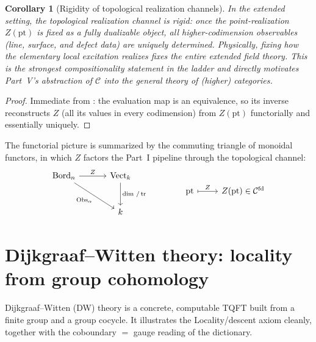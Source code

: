 \documentclass[12pt]{article}
\newtheorem{corollary}[corollary]{Corollary}
\theoremstyle{definition}
\theoremstyle{remark}
\newcommand{\Bord}{\mathrm{Bord}}
\newcommand{\Vect}{\mathrm{Vect}}
\newcommand{\Obs}{\mathrm{Obs}}
\newcommand{\sfd}{^{\mathrm{fd}}}
\begin{document}
\begin{corollary}[Rigidity of topological realization channels]
\label{cor:rigidity}
In the extended setting, the topological realization channel is \emph{rigid}: once
the point-realization $Z(\mathrm{pt})$ is fixed as a fully dualizable object, all
higher-codimension observables (line, surface, and defect data) are uniquely
determined. Physically, fixing how the elementary local excitation realizes fixes
the entire extended field theory. This is the strongest compositionality statement
in the ladder and directly motivates Part~V's abstraction of $\mathcal{C}$ into the
general theory of (higher) categories.
\end{corollary}

\begin{proof}
Immediate from : the evaluation map is an equivalence, so
its inverse reconstructs $Z$ (all its values in every codimension) from
$Z(\mathrm{pt})$ functorially and essentially uniquely.
\end{proof}

The functorial picture is summarized by the commuting triangle of monoidal
functors, in which $Z$ factors the Part~I pipeline through the topological
channel:
\[
\begin{tikzcd}[column sep=3.2em, row sep=large]
\Bord_n \arrow[r, "Z"] \arrow[dr, "\Obs_\alpha"'] & \Vect_k \arrow[d, "\dim\,/\,\mathrm{tr}"]\\
& k
\end{tikzcd}
\qquad\qquad
\begin{tikzcd}[column sep=2.4em]
\mathrm{pt} \arrow[r, mapsto, "Z"] & Z(\mathrm{pt})\in\mathcal{C}\sfd
\end{tikzcd}
\]

\section{Dijkgraaf--Witten theory: locality from group cohomology}
\label{sec:dw}

Dijkgraaf--Witten (DW) theory is a concrete, computable TQFT built from a finite
group and a group cocycle. It illustrates the Locality/descent axiom cleanly,
together with the coboundary $=$ gauge reading of the dictionary.
\end{document}
